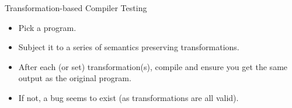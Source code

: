 \documentclass{beamer}
\begin{document}
    \begin{frame}{Transformation-based Compiler Testing}

        \begin{itemize}
            \item Pick a program.
            \item Subject it to a series of semantics preserving transformations.
            \item After each (or set) transformation(s), compile and ensure you get the same output as the original program.
            \item If not, a bug seems to exist (as transformations are all valid).
        \end{itemize}

        \begin{figure}
        \end{figure}

    \end{frame}

\end{document}
